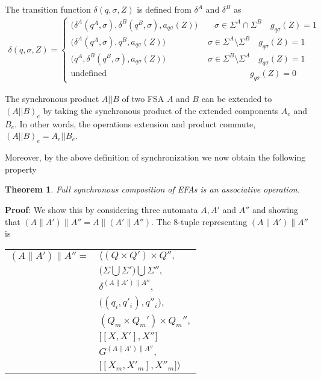 \documentclass{article}
\newtheorem{theorem}{Theorem}
\begin{document}
 The transition function
$\delta(q,\sigma,Z)$ is defined from $\delta^A$ and $\delta^B$ as
\begin{eqnarray}
\delta(q,\sigma,Z)=\left\{
\begin{array}{ll}
\big(\delta^A(q^A,\sigma),\delta^B(q^B,\sigma),a_{q \sigma}(Z)\big) \quad\quad \sigma\in \Sigma^A \cap \Sigma^B \quad g_{q \sigma}(Z)=1\\
\big(\delta^A(q^A,\sigma),q^B,a_{q \sigma}(Z)\big) \quad\quad\quad\quad\quad \sigma\in \Sigma^A \setminus \Sigma^B \quad g_{q \sigma}(Z)=1\\
\big(q^A,\delta^B(q^B,\sigma),a_{q \sigma}(Z)\big) \quad\quad\quad\quad\quad \sigma\in \Sigma^B \setminus \Sigma^A \quad g_{q \sigma}(Z)=1\\
\textrm{
undefined}\quad\quad\quad\quad\quad\quad\quad\quad\quad\quad\quad\quad\quad\quad\quad\quad\quad
g_{q\sigma}(Z)=0
\end{array}\right.
\end{eqnarray}

The synchronous product $A||B$ of two FSA $A$ and $B$ can be
extended to $(A||B)_e$ by taking the synchronous product of the
extended components  $A_e$ and $B_e$. In other words, the
operations extension and product commute, $(A||B)_e=A_e||B_e$.

Moreover, by the above definition of synchronization we now obtain
the following property

\begin{theorem}
   Full synchronous composition of EFAs is an associative
   operation.
\end{theorem}

\noindent \textbf{Proof}: We show this by considering three
automata $A, A'$ and $A''$ and showing that $(A\|A')\|A'' =
A\|(A'\|A'')$.
\newline\newline
\noindent The 8-tuple representing $(A\|A')\|A''$ is
\begin{center}
\begin{tabular}{ll}
  $(A\|A')\|A'' =$ & $\Big \langle (Q \times Q') \times Q'',$\\
  & $ \big(\Sigma \bigcup \Sigma' \big) \bigcup \Sigma'',$\\
  & $\delta^{(A\|A')\|A''},$\\
  & $\big((q_i, q'_i) , q''_i\big),$\\
  & $(Q_m \times Q_m') \times Q_m'',$\\
  & $\big[[X, X'], X'']$\\
  & $G^{(A\|A')\|A''},$\\
  & $\big[[X_m, X'_m], X''_m \big] \Big \rangle$
\end{tabular}
\end{center}
\end{document}

